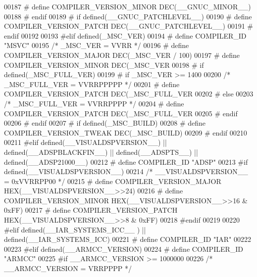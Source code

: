 \begin{DoxyCode}
{{{{{{{{{{{{{{{{{{{{{{{{00187 \textcolor{preprocessor}{#  define COMPILER\_VERSION\_MINOR DEC(\_\_GNUC\_MINOR\_\_)}
00188 \textcolor{preprocessor}{# endif}
00189 \textcolor{preprocessor}{# if defined(\_\_GNUC\_PATCHLEVEL\_\_)}
00190 \textcolor{preprocessor}{#  define COMPILER\_VERSION\_PATCH DEC(\_\_GNUC\_PATCHLEVEL\_\_)}
00191 \textcolor{preprocessor}{# endif}
00192 
00193 \textcolor{preprocessor}{#elif defined(\_MSC\_VER)}
00194 \textcolor{preprocessor}{# define COMPILER\_ID "MSVC"}
00195   \textcolor{comment}{/* \_MSC\_VER = VVRR */}
00196 \textcolor{preprocessor}{# define COMPILER\_VERSION\_MAJOR DEC(\_MSC\_VER / 100)}
00197 \textcolor{preprocessor}{# define COMPILER\_VERSION\_MINOR DEC(\_MSC\_VER %
00198 \textcolor{preprocessor}{# if defined(\_MSC\_FULL\_VER)}
00199 \textcolor{preprocessor}{#  if \_MSC\_VER >= 1400}
00200     \textcolor{comment}{/* \_MSC\_FULL\_VER = VVRRPPPPP */}
00201 \textcolor{preprocessor}{#   define COMPILER\_VERSION\_PATCH DEC(\_MSC\_FULL\_VER %
00202 \textcolor{preprocessor}{#  else}
00203     \textcolor{comment}{/* \_MSC\_FULL\_VER = VVRRPPPP */}
00204 \textcolor{preprocessor}{#   define COMPILER\_VERSION\_PATCH DEC(\_MSC\_FULL\_VER %
00205 \textcolor{preprocessor}{#  endif}
00206 \textcolor{preprocessor}{# endif}
00207 \textcolor{preprocessor}{# if defined(\_MSC\_BUILD)}
00208 \textcolor{preprocessor}{#  define COMPILER\_VERSION\_TWEAK DEC(\_MSC\_BUILD)}
00209 \textcolor{preprocessor}{# endif}
00210 
00211 \textcolor{preprocessor}{#elif defined(\_\_VISUALDSPVERSION\_\_) || defined(\_\_ADSPBLACKFIN\_\_) || defined(\_\_ADSPTS\_\_) ||
       defined(\_\_ADSP21000\_\_)}
00212 \textcolor{preprocessor}{# define COMPILER\_ID "ADSP"}
00213 \textcolor{preprocessor}{#if defined(\_\_VISUALDSPVERSION\_\_)}
00214   \textcolor{comment}{/* \_\_VISUALDSPVERSION\_\_ = 0xVVRRPP00 */}
00215 \textcolor{preprocessor}{# define COMPILER\_VERSION\_MAJOR HEX(\_\_VISUALDSPVERSION\_\_>>24)}
00216 \textcolor{preprocessor}{# define COMPILER\_VERSION\_MINOR HEX(\_\_VISUALDSPVERSION\_\_>>16 & 0xFF)}
00217 \textcolor{preprocessor}{# define COMPILER\_VERSION\_PATCH HEX(\_\_VISUALDSPVERSION\_\_>>8  & 0xFF)}
00218 \textcolor{preprocessor}{#endif}
00219 
00220 \textcolor{preprocessor}{#elif defined(\_\_IAR\_SYSTEMS\_ICC\_\_ ) || defined(\_\_IAR\_SYSTEMS\_ICC)}
00221 \textcolor{preprocessor}{# define COMPILER\_ID "IAR"}
00222 
00223 \textcolor{preprocessor}{#elif defined(\_\_ARMCC\_VERSION)}
00224 \textcolor{preprocessor}{# define COMPILER\_ID "ARMCC"}
00225 \textcolor{preprocessor}{#if \_\_ARMCC\_VERSION >= 1000000}
00226   \textcolor{comment}{/* \_\_ARMCC\_VERSION = VRRPPPP */}
}}}}}}}}}}}}}}}}}}}}}}}}}}}
\end{DoxyCode}
